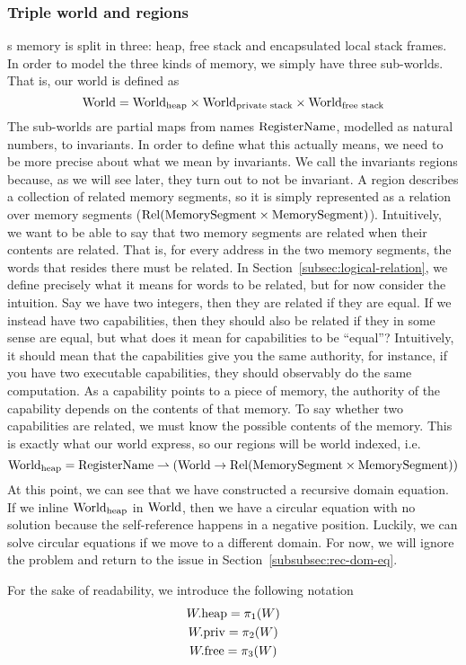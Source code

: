 \begin{jversion}
\subsubsection{Triple world and regions}
\srccm{}s memory is split in three: heap, free stack and encapsulated local stack frames.
In order to model the three kinds of memory, we simply have three sub-worlds.
That is, our world is defined as
\[
  \mathrm{World} = \mathrm{World}_\mathrm{heap} \times \mathrm{World}_\text{private stack} \times \mathrm{World}_\text{free stack}
\]
The sub-worlds are partial maps from names $\mathrm{RegisterName}$, modelled as natural numbers, to invariants.
In order to define what this actually means, we need to be more precise about what we mean by invariants.
We call the invariants regions because, as we will see later, they turn out to not be invariant.
A region describes a collection of related memory segments, so it is simply represented as a relation over memory segments ($\mathrm{Rel}(\mathrm{MemorySegment} \times \mathrm{MemorySegment})$).
Intuitively, we want to be able to say that two memory segments are related when their contents are related.
That is, for every address in the two memory segments, the words that resides there must be related.
In Section~\ref{subsec:logical-relation}, we define precisely what it means for words to be related, but for now consider the intuition.
Say we have two integers, then they are related if they are equal.
If we instead have two capabilities, then they should also be related if they in some sense are equal, but what does it mean for capabilities to be ``equal''?
Intuitively, it should mean that the capabilities give you the same authority, for instance, if you have two executable capabilities, they should observably do the same computation.
As a capability points to a piece of memory, the authority of the capability depends on the contents of that memory.
To say whether two capabilities are related, we must know the possible contents of the memory.
This is exactly what our world express, so our regions will be world indexed, i.e.
\[
  \mathrm{World}_\mathrm{heap} = \mathrm{RegisterName} \rightharpoonup (\mathrm{World} \rightarrow \mathrm{Rel}(\mathrm{MemorySegment} \times \mathrm{MemorySegment}))
\]
At this point, we can see that we have constructed a recursive domain equation.
If we inline $\mathrm{World}_\mathrm{heap}$ in $\mathrm{World}$, then we have a circular equation with no solution because the self-reference happens in a negative position.
Luckily, we can solve circular equations if we move to a different domain.
For now, we will ignore the problem and return to the issue in Section~\ref{subsubsec:rec-dom-eq}.

For the sake of readability, we introduce the following notation
\begin{gather*}
  W.\mathrm{heap} = \pi_1(W)\\
  W.\mathrm{priv} = \pi_2(W)\\
  W.\mathrm{free} = \pi_3(W)
\end{gather*}


\end{jversion}
